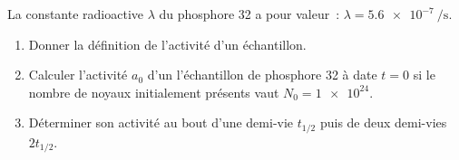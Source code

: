 La constante radioactive $\lambda$ du phosphore 32 a pour valeur~:
$\lambda=\qty{5,6e-7}{\per\second}$.
\begin{enumerate}
    \item Donner la définition de l'activité d'un échantillon.
    \item Calculer l'activité $a_0$ d'un l'échantillon de phosphore 32 à date
          $t=0$ si le nombre de noyaux initialement présents vaut
          $N_0=\num{1e24}$.
    \item Déterminer son activité au bout d'une demi-vie $t_{1/2}$ puis de deux
          demi-vies $2t_{1/2}$.
\end{enumerate}

